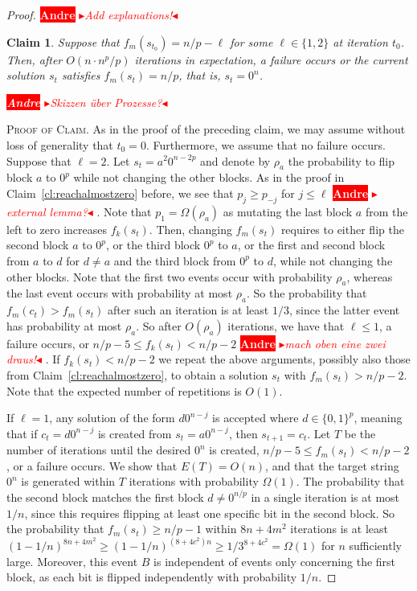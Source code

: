 \documentclass[
sigconf = false, %
review = false, %
screen = true, %
anonymous = true, %
format=acmsmall
]{acmart}
\newtheorem{claim}{Claim}
\newenvironment{proofofclaim}{\textsc{Proof of Claim.}}{\hfill\scriptsize\scalebox{1}{$\blacksquare$}}
\newcommand{\nbc}[3]{
		{\colorbox{#3}{\bfseries\sffamily\scriptsize\textcolor{white}{#1}}}
		{\textcolor{#3}{\sf\small$\blacktriangleright$\textit{#2}$\blacktriangleleft$}}
}
\newcommand{\andre}[1]{\nbc{Andre}{#1}{red}}
\begin{document}
\begin{proof}
\andre{Add explanations!}

\begin{claim}
    \label{cl:reachzero}
    Suppose that $f_m(s_{t_0}) = n/p - \ell$ for some $\ell \in \{1,2\}$ at iteration $t_0$. Then, after $O(n \cdot n^p/p)$ iterations in expectation, a failure occurs or the current solution $s_t$ satisfies $f_m(s_t) = n/p$, that is, $s_t = 0^n$.
    \andre{Skizzen über Prozesse?}
\end{claim}
    
\begin{proofofclaim}
    As in the proof of the preceding claim, we may assume without loss of generality that $t_0 = 0$. Furthermore, we assume that no failure occurs. %
    Suppose that $\ell=2$. Let $s_t=a^2 0^{n-2p}$ and denote by $\rho_a$ the probability to flip block $a$ to $0^p$ while not changing the other blocks. As in the proof in Claim~\ref{cl:reachalmostzero} before, we see that $p_j \geq p_{-j}$ for $j \leq \ell$ \andre{external lemma?}. Note that $p_1 = \Omega(\rho_a)$ as mutating the last block $a$ from the left to zero increases $f_k(s_t)$. Then, changing $f_m(s_t)$ requires to either flip the second block $a$ to $0^p$, or the third block $0^p$ to $a$, or the first and second block from $a$ to $d$ for $d \neq a$ and the third block from $0^p$ to $d$, while not changing the other blocks. Note that the first two events occur with probability $\rho_a$, whereas the last event occurs with probability at most $\rho_a$. So the probability that $f_m(c_t)>f_m(s_t)$ after such an iteration is at least $1/3$, since the latter event has probability at most $\rho_a$. So after $O(\rho_a)$ iterations, we have that $\ell \leq 1$, a failure occurs, or $n/p - 5 \leq f_k(s_t)<n/p-2$ \andre{mach oben eine zwei draus!}. If $f_k(s_t)<n/p-2$ we repeat the above arguments, possibly also those from Claim~\ref{cl:reachalmostzero}, to obtain a solution $s_t$ with $f_m(s_t) > n/p-2$. Note that the expected number of repetitions is $O(1)$.  
    
    If $\ell=1$, any solution of the form $d0^{n-j}$ is accepted where $d \in \{0,1\}^p$, meaning that if $c_t=d0^{n-j}$ is created from $s_t=a0^{n-j}$, then $s_{t+1}=c_t$. Let $T$ be the number of iterations until the desired $0^n$ is created, $n/p-5 \leq f_m(s_t) < n/p-2$, or a failure occurs. We show that $E(T)=O(n)$, and that the target string $0^n$ is generated within $T$ iterations with probability $\Omega(1)$. The probability that the second block matches the first block $d \neq 0^{n/p}$ in a single iteration is at most $1/n$, since this requires flipping at least one specific bit in the second block. So the probability that $f_m(s_t) \geq n/p-1$ within $8n+4m^2$ iterations is at least $(1-1/n)^{8n+4m^2} \geq (1-1/n)^{(8+4c^2)n} \geq 1/3^{8+4c^2} = \Omega(1)$ for $n$ sufficiently large. Moreover, this event $B$ is independent of events only concerning the first block, as each bit is flipped independently with probability $1/n$.  
    

\end{proofofclaim}
\end{proof}
\end{document}
